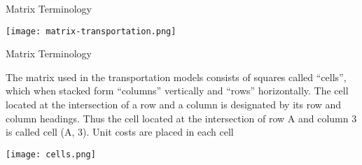 \documentclass[../main.tex]{subfiles}
\begin{document}
\begin{frame}{Matrix Terminology}
  
  {\centering
  \texttt{[image: matrix-transportation.png]}
  \par}
\end{frame}

\begin{frame}{Matrix Terminology}

     The matrix used in the transportation models consists of squares called ``cells'', which when stacked form ``columns'' vertically and ``rows'' horizontally. The cell located at the intersection of a row and a column is designated by its row and column headings. Thus the cell located at the intersection of row A and column 3 is called cell (A, 3). Unit costs are placed in each cell

  {\centering \texttt{[image: cells.png]}\par}
\end{frame}
\end{document}
